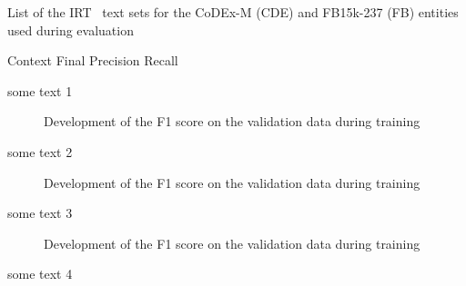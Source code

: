 \begin{table}
    \centering
    
    \caption{List of the IRT~\cite{} text sets for the CoDEx-M (CDE) \cite{Safavi2020CoDExAC} and FB15k-237 (FB) \cite{Toutanova2015ObservedVL} entities used during evaluation}
    \label{tab:a_appendix/text_sets_all}
\end{table}

\begin{table}
    \centering
    
    \caption{Context Final Precision Recall}
    \label{tab:a_appendix/context_final_prec_rec}
\end{table}

some text 1

\begin{figure}[h]
    \centering
    
    \caption{Development of the F1 score on the validation data during training}
    \label{fig:a_appendix/static_classes_1}
\end{figure}

some text 2

\begin{figure}[h]
    \centering
    
    \caption{Development of the F1 score on the validation data during training}
    \label{fig:a_appendix/static_classes_2}
\end{figure}

some text 3

\begin{figure}[h]
    \centering
    
    \caption{Development of the F1 score on the validation data during training}
    \label{fig:a_appendix/static_classes_3}
\end{figure}

some text 4
